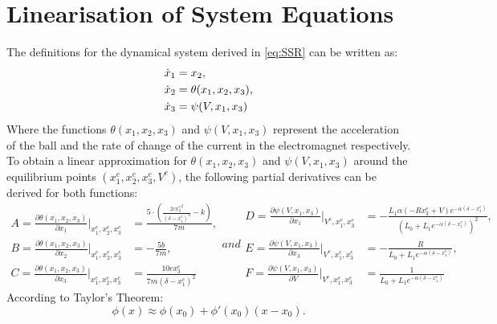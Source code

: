 \documentclass[a4paper,10pt,reqno]{amsart}
\numberwithin{equation}{section}
\begin{document}
\section{Linearisation of System Equations}
The definitions for the dynamical system derived in \eqref{eq:SSR} can be written as:
\begin{align}
\notag \dot x_1 &= x_2,                  \\
\notag \dot x_2 &= \theta(x_1, x_2, x_3),  \\
\notag \dot x_3 &= \psi(V, x_1, x_3)
\end{align}
Where the functions $\theta(x_1, x_2, x_3)$ and $\psi(V, x_1, x_3)$ represent the acceleration of the ball and the rate of change of the current in the electromagnet respectively.
To obtain a linear approximation for $\theta(x_1, x_2, x_3)$ and $\psi(V, x_1, x_3)$ around the equilibrium points $(x_1^e, x_2^e, x_3^e, V^e)$, the following partial derivatives can be derived for both functions:
\begin{subequations}
\label{eq:theta__psi_constants}
\begin{align}
    A = \frac{\partial \theta(x_1,x_2,x_3)}{\partial x_1}\bigg|_{x_1^e, x_2^e, x_3^e} &= \frac{5 \cdot \left(\frac{2 c {x_{3}^e}^{2}}{\left(\delta - x_{1}^e\right)^{3}} - k\right)}{7 m}, \\
    B = \frac{\partial \theta(x_1,x_2,x_3)}{\partial x_2}\bigg|_{x_1^e, x_2^e, x_3^e} &= - \frac{5 b}{7 m}, \\
    C = \frac{\partial \theta(x_1,x_2,x_3)}{\partial x_3}\bigg|_{x_1^e, x_2^e, x_3^e} &= \frac{10 c x_3^e}{7 m \left(\delta - x_1^e\right)^{2}}
\end{align}
and
\begin{align}
    D = \frac{\partial \psi(V,x_1,x_3)}{\partial x_1}\bigg|_{V^e, x_1^e, x_3^e} &= - \frac{L_{1} \alpha \left(- R x_{3}^e + V\right) e^{- \alpha \left(\delta - x_{1}^e\right)}}{\left(L_{0} + L_{1} e^{- \alpha \left(\delta - x_{1}^e\right)}\right)^{2}}, \\
    E = \frac{\partial \psi(V,x_1,x_3)}{\partial x_3}\bigg|_{V^e, x_1^e, x_3^e} &=- \frac{R}{L_{0} + L_{1} e^{- \alpha \left(\delta - x_{1}^e\right)}}, \\
    F = \frac{\partial \psi(V,x_1,x_3)}{\partial V}\bigg|_{V^e, x_1^e, x_3^e} &=\frac{1}{L_{0} + L_{1} e^{- \alpha \left(\delta - x_{1}^e\right)}}
\end{align}
\end{subequations}
According to Taylor's Theorem:
\begin{equation}
\label{eq:taylor_theorem}
    \phi(x) \approx \phi(x_0) + \phi'(x_0)(x-x_0).
\end{equation}
\end{document}
